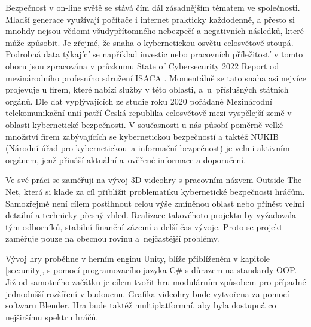 Bezpečnost v on-line světě se stává čím dál zásadnějším tématem ve společnosti. Mladší generace využívají počítače i internet prakticky každodenně, a přesto si mnohdy nejsou vědomi všudypřítomného nebezpečí a negativních následků, které může způsobit. Je zřejmé, že snaha o kybernetickou osvětu celosvětově stoupá. Podrobná data týkající se například investic nebo pracovních příležitostí v tomto oboru jsou zpracována v průzkumu State of Cybersecurity 2022 Report od mezinárodního profesního sdružení ISACA \cite{isaca}. Momentálně se tato snaha asi nejvíce projevuje u firem, které nabízí služby v této oblasti, a~u~příslušných státních orgánů. Dle dat vyplývajících ze studie roku 2020 \cite{ita} pořádané Mezinárodní telekomunikační unií patří Česká republika celosvětově mezi vyspělejší země v oblasti kybernetické bezpečnosti. V současnosti u nás působí poměrně velké množství firem zabývajících se kybernetickou bezpečností a taktéž NUKIB (Národní úřad pro kybernetickou~a informační bezpečnost) je velmi aktivním orgánem, jenž přináší aktuální a~ověřené informace a doporučení. \cite{nukib}

Ve své práci se zaměřuji na vývoj 3D videohry s pracovním názvem Outside The Net, která si klade za cíl přiblížit problematiku kybernetické bezpečnosti hráčům. Samozřejmě není cílem postihnout celou výše zmíněnou oblast nebo přinést velmi detailní a technicky přesný vhled. Realizace takovéhoto projektu by vyžadovala tým odborníků, stabilní finanční zázemí a delší čas vývoje. Proto se projekt zaměřuje pouze na obecnou rovinu a~nejčastější problémy.

Vývoj hry proběhne v herním enginu Unity, blíže přiblíženém v kapitole \ref{sec:unity}, s pomocí programovacího jazyka C\# s důrazem na standardy OOP. Již od samotného začátku je cílem tvořit hru modulárním způsobem pro případné jednodušší rozšíření v budoucnu. Grafika videohry bude vytvořena za pomocí softwaru Blender. Hra bude taktéž multiplatformní, aby byla dostupná co nejširšímu spektru hráčů.